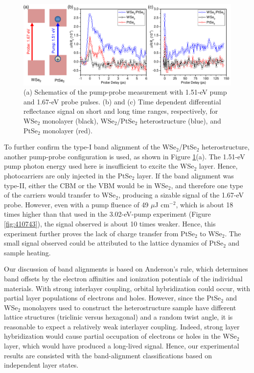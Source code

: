 \documentclass[10pt]{iopart}
\begin{document}
\begin{figure}[ht!]
  \centering
  \includegraphics[width=16cm]{820743.pdf}
  \caption{(a) Schematics of the pump-probe measurement with 1.51-eV pump and 1.67-eV probe pulses. (b) and (c) Time dependent differential reflectance signal on short and long time ranges, respectively, for WSe$_2$ monolayer (black), WSe$_2$/PtSe$_2$ heterostructure (blue), and PtSe$_2$ monolayer (red).}
    \label{fig:820743}
\end{figure}

To further confirm the type-I band alignment of the WSe$_2$/PtSe$_2$ heterostructure, another pump-probe configuration is used, as shown in Figure \ref{fig:820743}(a). The 1.51-eV pump photon energy used here is insufficient to excite the WSe$_2$ layer. Hence, photocarriers are only injected in the PtSe$_2$ layer. If the band alignment was type-II, either the CBM or the VBM would be in WSe$_2$, and therefore one type of the carriers would transfer to WSe$_2$, producing a sizable signal of the 1.67-eV probe. However, even with a pump fluence of 49 $\mu$J cm$^{-2}$, which is about 18 times higher than that used in the 3.02-eV-pump experiment (Figure \ref{fig:410743}), the signal observed is about 10 times weaker. Hence, this experiment further proves the lack of charge transfer from PtSe$_2$ to WSe$_2$. The small signal observed could be attributed to the lattice dynamics of PtSe$_2$ \cite{chen2019direct} and sample heating. 

Our discussion of band alignments is based on Anderson’s rule, which determines band offsets by the electron affinities and ionization potentials of the individual materials. With strong interlayer coupling, orbital hybridization could occur\cite{koda2018trends,kiemle2020control,zheng2017phonon,wilson2017determination}, with partial layer populations of electrons and holes. However, since the PtSe$_2$ and WSe$_2$ monolayers used to construct the heterostructure sample have different lattice structures (triclinic versus hexagonal) and a random twist angle, it is reasonable to expect a relatively weak interlayer coupling. Indeed, strong layer hybridization would cause partial occupation of electrons or holes in the WSe$_2$ layer, which would have produced a long-lived signal. Hence, our experimental results are consisted with the band-alignment classifications based on independent layer states.
\end{document}
